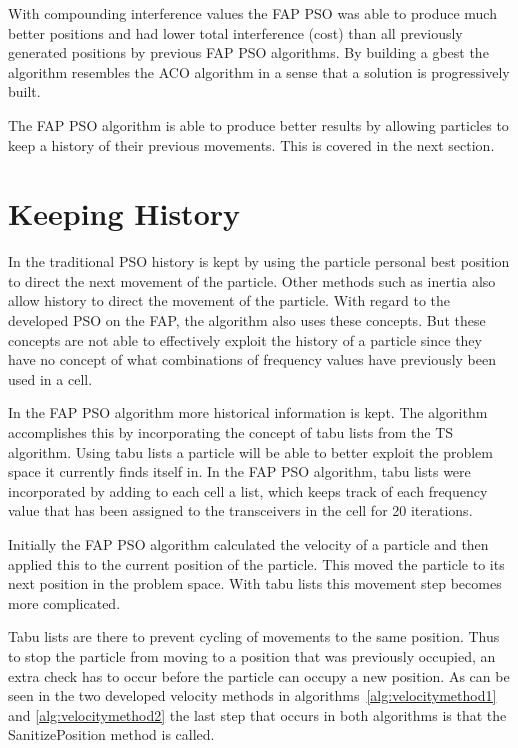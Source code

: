 With compounding interference values the \gls{FAP} \gls{PSO} was able to produce much better positions and had lower total interference (cost) than all previously generated positions by previous \gls{FAP} \gls{PSO} algorithms. By building a gbest the algorithm resembles the ACO algorithm in a sense that a solution is progressively built.

The \gls{FAP} \gls{PSO} algorithm is able to produce better results by allowing particles to keep a history of their previous movements. This is covered in the next section.
\section{Keeping History}
\label{sec:keepinghistory}
In the traditional \gls{PSO} history is kept by using the particle personal best position to direct the next movement of the particle. Other methods such as inertia also allow history to direct the movement of the particle. With regard to the developed \gls{PSO} on the \gls{FAP}, the algorithm also uses these concepts. But these concepts are not able to effectively exploit the history of a particle since they have no concept of what combinations of frequency values have previously been used in a cell.

In the \gls{FAP} \gls{PSO} algorithm more historical information is kept. The algorithm accomplishes this by incorporating the concept of tabu lists from the \gls{TS} algorithm. Using tabu lists a particle will be able to better exploit the problem space it currently finds itself in. In the \gls{FAP} \gls{PSO} algorithm, tabu lists were incorporated by adding to each cell a list, which keeps track of each frequency value that has been assigned to the transceivers in the cell for 20 iterations.

Initially the \gls{FAP} \gls{PSO} algorithm calculated the velocity of a particle and then applied this to the current position of the particle. This moved the particle to its next position in the problem space. With tabu lists this movement step becomes more complicated.

Tabu lists are there to prevent cycling of movements to the same position. Thus to stop the particle from moving to a position that was previously occupied, an extra check has to occur before the particle can occupy a new position. As can be seen in the two developed velocity methods in algorithms~\ref{alg:velocitymethod1} and \ref{alg:velocitymethod2} the last step that occurs in both algorithms is that the SanitizePosition method is called.


